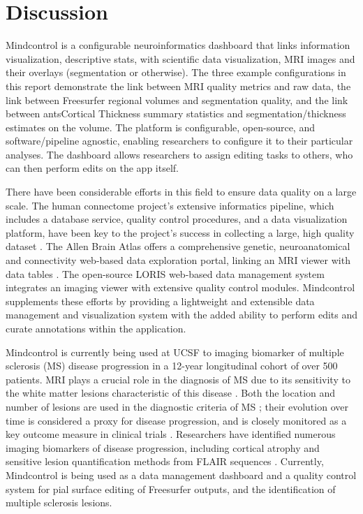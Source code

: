 \section{Discussion}

Mindcontrol is a configurable neuroinformatics dashboard that links information visualization, descriptive stats, with scientific data visualization, MRI images and their overlays (segmentation or otherwise). The three example configurations in this report demonstrate the link between MRI quality metrics and raw data, the link between Freesurfer regional volumes and segmentation quality, and the link between antsCortical Thickness summary statistics and segmentation/thickness estimates on the volume. The platform is configurable, open-source, and software/pipeline agnostic, enabling researchers to configure it to their particular analyses. The dashboard allows researchers to assign editing tasks to others, who can then perform edits on the app itself. 

There have been considerable efforts in this field to ensure data quality on a large scale. The human connectome project's extensive informatics pipeline, which includes a database service, quality control procedures, and a data visualization platform, have been key to the project's success in collecting a large, high quality dataset \cite{Marcus_2013}. The Allen Brain Atlas offers a comprehensive genetic, neuroanatomical and connectivity web-based data exploration portal, linking an MRI viewer with data tables \cite{Sunkin_2012}. The open-source LORIS web-based data management system integrates an imaging viewer with extensive quality control modules\cite{Das_2012}. Mindcontrol supplements these efforts by providing a lightweight and extensible data management and visualization system with the added ability to perform edits and curate annotations within the application. 

Mindcontrol is currently being used at UCSF to imaging biomarker of multiple sclerosis (MS) disease progression in a 12-year longitudinal cohort of over 500 patients. MRI plays a crucial role in the diagnosis of MS due to its sensitivity to the white matter lesions characteristic of this disease \cite{ge2006multiple}.  Both the location and number of lesions are used in the diagnostic criteria of MS \cite{mcdonald2001recommended}; their evolution over time is considered a proxy for disease progression, and is closely monitored as a key outcome measure in clinical trials \cite{ge2000glatiramer}. Researchers have identified numerous imaging biomarkers of disease progression, including cortical atrophy \cite{fisher2008gray} and sensitive lesion quantification methods from FLAIR sequences \cite{Schmidt_2012}. Currently, Mindcontrol is being used as a data management dashboard and a quality control system for pial surface editing of Freesurfer outputs, and the identification of multiple sclerosis lesions.

